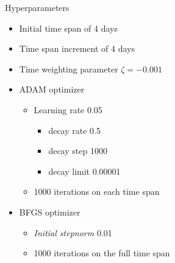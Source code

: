 \begin{frame}{Hyperparameters}
    \begin{itemize}
        \item<1-> Initial time span of 4 days
        \item<1-> Time span increment of 4 days
        \item<2-> Time weighting parameter $\zeta = -0.001$
        \item<3-> ADAM optimizer
        \begin{itemize}
            \item Learning rate 0.05
            \begin{itemize}
                \item decay rate 0.5
                \item decay step 1000
                \item decay limit 0.00001
            \end{itemize}
            \item 1000 iterations on each time span
        \end{itemize}
        \item<4-> BFGS optimizer
        \begin{itemize}
            \item \textit{Initial stepnorm} 0.01
            \item 1000 iterations on the full time span
        \end{itemize}
    \end{itemize}
\end{frame}
